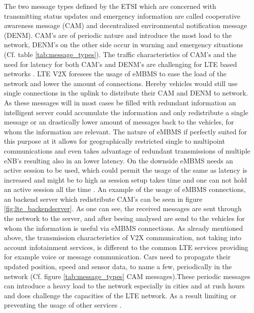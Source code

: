 \documentclass[conference,12pt,onecolumn]{IEEEtran}
\begin{document}
The two message types defined by the ETSI which are concerned with transmitting status updates and emergency information are called cooperative awareness message (CAM) and decentralized environmental notification message (DENM). CAM's are of periodic nature and introduce the most load to the network, DENM's on the other side occur in warning and emergency situations (Cf. table \ref{tab:message_types}). The traffic characteristics of CAM's and the need for latency for both CAM's and DENM's are challenging for LTE based networks \cite{seo2016}.
LTE V2X foresees the usage of eMBMS to ease the load of the network and lower the amount of connections. Hereby vehicles would still use single connections in the uplink to distribute their CAM and DENM to network. As these messages will in most cases be filled with redundant information an intelligent server could accumulate the information and only redistribute a single message or an drastically lower amount of messages back to the vehicles, for whom the information are relevant. The nature of eMBMS if perfectly suited for this purpose at it allows for geographically restricted single to multipoint communications and even takes advantage of redundant transmissions of multiple eNB's \cite{araniti2013} resulting also in an lower latency.
On the downside eMBMS needs an active session to be used, which could permit the usage of the same as latency is increased and might be to high as session setup takes time and one can not hold an active session all the time \cite{lee2016}. An example of the usage of eMBMS connections, an backend server which redistribute CAM's can be seen in figure \ref{fig:lte_backendserver}. As one can see, the received messages are sent through the network to the server, and after beeing analysed are send to the vehicles for whom the information is useful via eMBMS connections. As already mentioned above, the transmission characteristics of V2X communication, not taking into account infotainment services, is different to the common LTE services providing for example voice or message communication. Cars need to propagate their updated position, speed and sensor data, to name a few, periodically in the network (Cf. figure \ref{tab:message_types} CAM messages).These periodic messages can introduce a heavy load to the network especially in cities and at rush hours and does challenge the capacities of the LTE network. As a result limiting or preventing the usage of other services \cite{araniti2013}.
\end{document}
